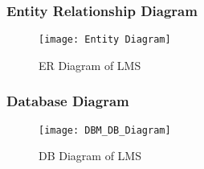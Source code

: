 \subsubsection{Entity Relationship Diagram}
\begin{figure}[h]
  \centering
  \texttt{[image: Entity Diagram]}
  \caption{ER Diagram of LMS}
\end{figure}
\newpage


\subsubsection{Database Diagram}
\begin{figure}[h]
  \centering
  \texttt{[image: DBM\_DB\_Diagram]}
  \caption{DB Diagram of LMS}
\end{figure}

























